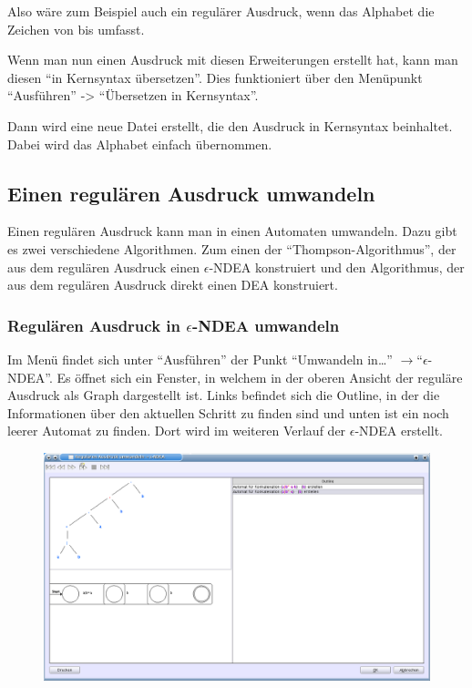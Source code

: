 Also wäre zum Beispiel auch \Symbol{[a-z]} ein regulärer Ausdruck, wenn das Alphabet die Zeichen von  bis  umfasst.

Wenn man nun einen Ausdruck mit diesen Erweiterungen erstellt hat, kann man diesen "`in Kernsyntax übersetzen"'. Dies funktioniert über den Menüpunkt "`Ausführen"' -> "`Übersetzen in Kernsyntax"'.

Dann wird eine neue Datei erstellt, die den Ausdruck in Kernsyntax beinhaltet. Dabei wird das Alphabet einfach übernommen.

\subsection{Einen regulären Ausdruck umwandeln}

Einen regulären Ausdruck kann man in einen Automaten umwandeln. Dazu gibt es zwei verschiedene Algorithmen. Zum einen der "`Thompson-Algorithmus"', der aus dem regulären Ausdruck einen $\epsilon$-NDEA konstruiert und den Algorithmus, der aus dem regulären Ausdruck direkt einen DEA konstruiert.

\subsubsection{Regulären Ausdruck in $\epsilon$-NDEA umwandeln}

Im Menü findet sich unter "`Ausführen"' der Punkt "`Umwandeln in\ldots"' $\rightarrow$"`$\epsilon$-NDEA"'. Es öffnet sich ein Fenster, in welchem in der oberen Ansicht der reguläre Ausdruck als Graph dargestellt ist. Links befindet sich die Outline, in der die Informationen über den aktuellen Schritt zu finden sind und unten ist ein noch leerer Automat zu finden. Dort wird im weiteren Verlauf der $\epsilon$-NDEA erstellt.

\begin{figure}[h]
\begin{center}
\includegraphics[width=12cm]{../images/regex_to_enfa.png}
\end{center}
\end{figure}

